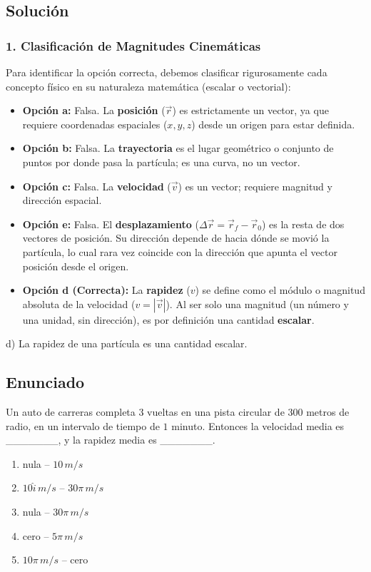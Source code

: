 \documentclass[12pt, a4paper]{article}
\begin{document}
\subsection*{Solución}

\subsubsection*{1. Clasificación de Magnitudes Cinemáticas}
Para identificar la opción correcta, debemos clasificar rigurosamente cada concepto físico en su naturaleza matemática (escalar o vectorial):
\begin{itemize}
    \item \textbf{Opción a:} Falsa. La \textbf{posición} ($\vec{r}$) es estrictamente un vector, ya que requiere coordenadas espaciales ($x, y, z$) desde un origen para estar definida.
    \item \textbf{Opción b:} Falsa. La \textbf{trayectoria} es el lugar geométrico o conjunto de puntos por donde pasa la partícula; es una curva, no un vector.
    \item \textbf{Opción c:} Falsa. La \textbf{velocidad} ($\vec{v}$) es un vector; requiere magnitud y dirección espacial.
    \item \textbf{Opción e:} Falsa. El \textbf{desplazamiento} ($\Delta \vec{r} = \vec{r}_f - \vec{r}_0$) es la resta de dos vectores de posición. Su dirección depende de hacia dónde se movió la partícula, lo cual rara vez coincide con la dirección que apunta el vector posición desde el origen.
    \item \textbf{Opción d (Correcta):} La \textbf{rapidez} ($v$) se define como el módulo o magnitud absoluta de la velocidad ($v = |\vec{v}|$). Al ser solo una magnitud (un número y una unidad, sin dirección), es por definición una cantidad \textbf{escalar}.
\end{itemize}

\begin{tcolorbox}[colback=green!5!white, colframe=green!50!black, title=Respuesta Final]
\centering \Large d) La rapidez de una partícula es una cantidad escalar.
\end{tcolorbox}

\newpage

\subsection*{Enunciado}
Un auto de carreras completa 3 vueltas en una pista circular de $300$ metros de radio, en un intervalo de tiempo de $1$ minuto. Entonces la velocidad media es \_\_\_\_\_\_\_, y la rapidez media es \_\_\_\_\_\_\_.
\begin{enumerate}[label=\alph*)]
    \item nula -- $10 \,\si{m/s}$
    \item $10\hat{i} \,\si{m/s}$ -- $30\pi \,\si{m/s}$
    \item nula -- $30\pi \,\si{m/s}$
    \item cero -- $5\pi \,\si{m/s}$
    \item $10\pi \,\si{m/s}$ -- cero
\end{enumerate}
\end{document}
